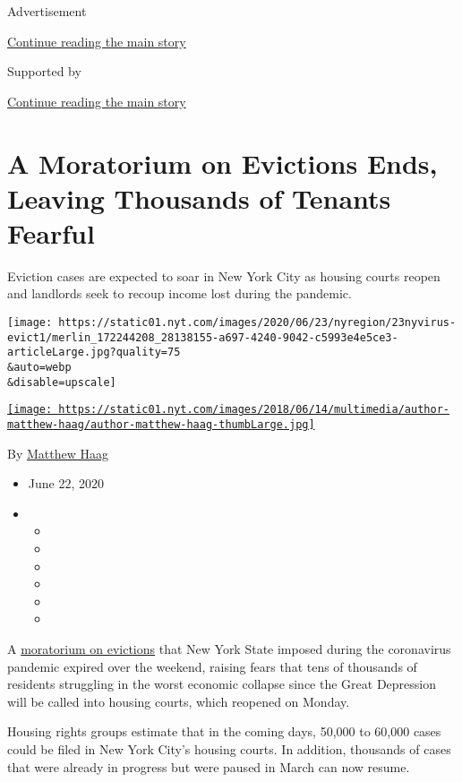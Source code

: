 Advertisement

\protect\hyperlink{after-top}{Continue reading the main story}

Supported by

\protect\hyperlink{after-sponsor}{Continue reading the main story}

\hypertarget{a-moratorium-on-evictions-ends-leaving-thousands-of-tenants-fearful}{%
\section{A Moratorium on Evictions Ends, Leaving Thousands of Tenants
Fearful}\label{a-moratorium-on-evictions-ends-leaving-thousands-of-tenants-fearful}}

Eviction cases are expected to soar in New York City as housing courts
reopen and landlords seek to recoup income lost during the pandemic.

\texttt{[image: https://static01.nyt.com/images/2020/06/23/nyregion/23nyvirus-evict1/merlin\_172244208\_28138155-a697-4240-9042-c5993e4e5ce3-articleLarge.jpg?quality=75\\\&auto=webp\\\&disable=upscale]}

\href{https://www.nytimes.com/by/matthew-haag}{\texttt{[image: https://static01.nyt.com/images/2018/06/14/multimedia/author-matthew-haag/author-matthew-haag-thumbLarge.jpg]}}

By \href{https://www.nytimes.com/by/matthew-haag}{Matthew Haag}

\begin{itemize}
\item
  June 22, 2020
\item
  \begin{itemize}
  \item
  \item
  \item
  \item
  \item
  \item
  \end{itemize}
\end{itemize}

A
\href{https://www.nytimes.com/2020/07/23/business/evictions-moratorium-cares-act.html}{moratorium
on evictions} that New York State imposed during the coronavirus
pandemic expired over the weekend, raising fears that tens of thousands
of residents struggling in the worst economic collapse since the Great
Depression will be called into housing courts, which reopened on Monday.

Housing rights groups estimate that in the coming days, 50,000 to 60,000
cases could be filed in New York City's housing courts. In addition,
thousands of cases that were already in progress but were paused in
March can now resume.

